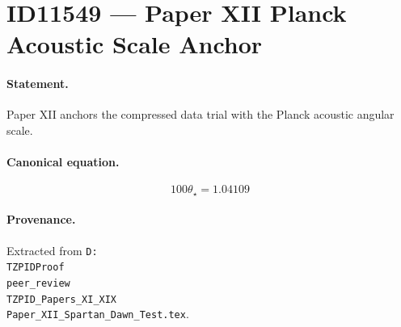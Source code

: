 \section*{ID11549 --- Paper XII Planck Acoustic Scale Anchor}

\paragraph{Statement.}
Paper XII anchors the compressed data trial with the Planck acoustic angular scale.

\paragraph{Canonical equation.}
\[
100\theta_\star=1.04109
\]

\paragraph{Provenance.}
Extracted from \texttt{D:\\TZPIDProof\\peer\_review\\TZPID\_Papers\_XI\_XIX\\Paper\_XII\_Spartan\_Dawn\_Test.tex}.
